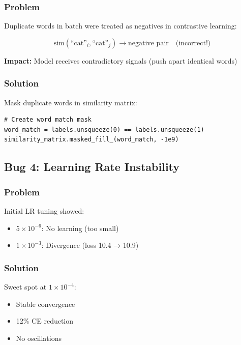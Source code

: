\documentclass[12pt,a4paper]{article}
\begin{document}
\subsubsection{Problem}
Duplicate words in batch were treated as negatives in contrastive learning:

\begin{equation}
\text{sim}(\text{``cat''}_i, \text{``cat''}_j) \rightarrow \text{negative pair} \quad \text{(incorrect!)}
\end{equation}

\textbf{Impact:} Model receives contradictory signals (push apart identical words)

\subsubsection{Solution}
Mask duplicate words in similarity matrix:

\begin{lstlisting}[caption=Duplicate Masking]
# Create word match mask
word_match = labels.unsqueeze(0) == labels.unsqueeze(1)
similarity_matrix.masked_fill_(word_match, -1e9)
\end{lstlisting}

\subsection{Bug 4: Learning Rate Instability}

\subsubsection{Problem}
Initial LR tuning showed:
\begin{itemize}
    \item $5 \times 10^{-6}$: No learning (too small)
    \item $1 \times 10^{-3}$: Divergence (loss 10.4 → 10.9)
\end{itemize}

\subsubsection{Solution}
Sweet spot at $1 \times 10^{-4}$:
\begin{itemize}
    \item Stable convergence
    \item 12\% CE reduction
    \item No oscillations
\end{itemize}
\end{document}

